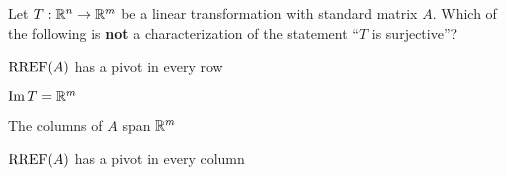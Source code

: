 \begin{readinessAssuranceTest}
\item Let $T: \mathbb{R}^n \rightarrow \mathbb{R}^m$ be a linear transformation with standard matrix $A$.  Which of the following is {\bf not} a characterization of the statement ``$T$ is surjective''?
\begin{readinessAssuranceTestChoices}
\item $\operatorname{RREF}(A)$ has a pivot in every row
\item $\operatorname{Im} T = \mathbb{R}^m$
\item The columns of $A$ span $\mathbb{R}^m$
\item $\operatorname{RREF}(A)$ has a pivot in every column %
\end{readinessAssuranceTestChoices}


\end{readinessAssuranceTest}
